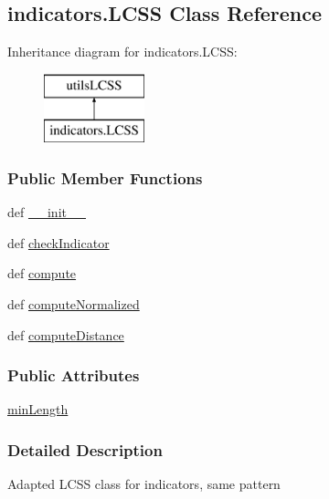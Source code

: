 \hypertarget{classindicators_1_1LCSS}{\subsection{indicators.\-L\-C\-S\-S Class Reference}
\label{classindicators_1_1LCSS}
}
Inheritance diagram for indicators.\-L\-C\-S\-S\-:\begin{figure}[H]
\begin{center}
\leavevmode
\includegraphics[height=2.000000cm]{classindicators_1_1LCSS}
\end{center}
\end{figure}
\subsubsection*{Public Member Functions}
\begin{DoxyCompactItemize}
\item 
def \hyperlink{classindicators_1_1LCSS_a17d13ad8eb307a864f475b388e05c9e0}{\-\_\-\-\_\-init\-\_\-\-\_\-}
\item 
def \hyperlink{classindicators_1_1LCSS_a4b79257cd0e5c8383db08553faa0853b}{check\-Indicator}
\item 
def \hyperlink{classindicators_1_1LCSS_a644d5b15a07d84756e32ab13cf19907d}{compute}
\item 
def \hyperlink{classindicators_1_1LCSS_af89b68438ef7f2040016f5e52d8415bd}{compute\-Normalized}
\item 
def \hyperlink{classindicators_1_1LCSS_acadd8297a0e637f11c85eebca941c4b8}{compute\-Distance}
\end{DoxyCompactItemize}
\subsubsection*{Public Attributes}
\begin{DoxyCompactItemize}
\item 
\hyperlink{classindicators_1_1LCSS_a64d8820e7557d7e6ad202de0b9a5ca43}{min\-Length}
\end{DoxyCompactItemize}


\subsubsection{Detailed Description}
\begin{DoxyVerb}Adapted LCSS class for indicators, same pattern\end{DoxyVerb}
 


